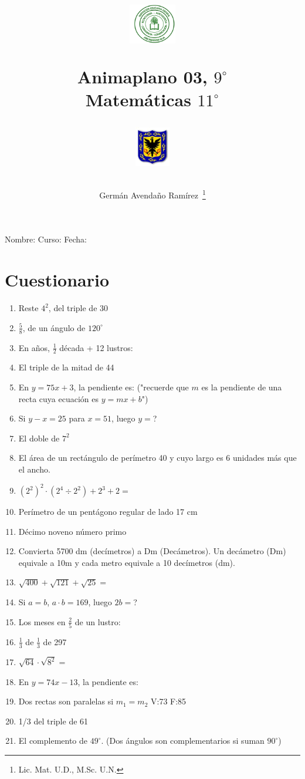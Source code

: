 \documentclass[11pt,twoside,letter]{article}
\author{Germ\'an Avenda\~no Ram\'irez~\thanks{Lic. Mat. U.D., M.Sc. U.N.}}
\title{\begin{minipage}{.2\textwidth}
\includegraphics[height=1.75cm]{Images/logo-colegio.png}\end{minipage}
\begin{minipage}{.55\textwidth}
\begin{center}
Animaplano 03, $9^{\circ}$  \\
Matemáticas $11^{\circ}$
\end{center}
\end{minipage}\hfill
\begin{minipage}{.2\textwidth}
\includegraphics[height=1.75cm]{Images/logo-sed.png} 
\end{minipage}}
\date{}
\begin{document}
\maketitle
Nombre: \hrulefill Curso: \underline{\hspace*{44pt}} Fecha: \underline{\hspace*{2.5cm}}
\section*{Cuestionario}
\begin{enumerate}
 \item Reste $4^{2}$, del triple de 30
 \item $\frac{5}{8}$, de un ángulo de $120^{\circ}$
 \item En años, $\frac{1}{2}$ década + 12 lustros:
 \item El triple de la mitad de 44
 \item En $y=75x+3$, la pendiente es: ("recuerde que $m$ es la pendiente de una recta cuya ecuaci\'{o}n es $y=mx+b$")
 \item Si $y-x=25$ para $x=51$, luego $y=$?
 \item El doble de $7^{2}$
 \item El área de un rectángulo de perímetro 40 y cuyo largo es 6 unidades más que el ancho.
 \item $(2^{2})^{2}\cdot (2^{4}\div 2^{2})+2^{3}+2=$
 \item Perímetro de un pentágono regular de lado 17 cm
 \item Décimo noveno número primo
 \item Convierta 5700 dm (decímetros) a Dm (Decámetros). Un decámetro (Dm) equivale a 10m y cada metro equivale a 10 decímetros (dm).
 \item $\sqrt{400}+\sqrt{121}+\sqrt{25}=$
 \item Si $a=b$, $a\cdot b=169$, luego $2b=$?
 \item Los meses en $\frac{2}{5}$ de un lustro:
 \item $\frac{1}{3}$ de $\frac{1}{3}$ de 297
 \item $\sqrt{64}\cdot \sqrt{8^{2}}=$
 \item En $y=74x-13$, la pendiente es:
 \item Dos rectas son paralelas si $m_{1}=m_{2}$ V:73 \quad F:85
 \item 1/3 del triple de 61
 \item El complemento de $49^{\circ}$. (Dos ángulos son complementarios si suman $90^{\circ}$)

\end{enumerate}
\end{document}
